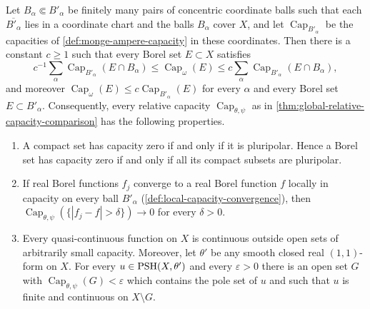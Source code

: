 \begin{proposition}\label{prop:global-local-capacity-equivalence}
Let $B_\alpha\Subset B'_\alpha$ be finitely many pairs of concentric coordinate balls such that each $\overline{B'_\alpha}$ lies in a coordinate chart and the balls $B_\alpha$ cover $X$, and let $\operatorname{Cap}_{B'_\alpha}$ be the capacities of \cref{def:monge-ampere-capacity} in these coordinates. Then there is a constant $c\geq1$ such that every Borel set $E\subset X$ satisfies
\[
 c^{-1}\sum_\alpha\operatorname{Cap}_{B'_\alpha}(E\cap B_\alpha)
  \leq\operatorname{Cap}_\omega(E)
  \leq c\sum_\alpha\operatorname{Cap}_{B'_\alpha}(E\cap B_\alpha),
\]
and moreover $\operatorname{Cap}_\omega(E)\leq c\operatorname{Cap}_{B'_\alpha}(E)$ for every $\alpha$ and every Borel set $E\subset B'_\alpha$. Consequently, every relative capacity $\operatorname{Cap}_{\theta,\psi}$ as in \cref{thm:global-relative-capacity-comparison} has the following properties.
\begin{enumerate}
 \item A compact set has capacity zero if and only if it is pluripolar. Hence a Borel set has capacity zero if and only if all its compact subsets are pluripolar.
 \item If real Borel functions $f_j$ converge to a real Borel function $f$ locally in capacity on every ball $B'_\alpha$ (\cref{def:local-capacity-convergence}), then $\operatorname{Cap}_{\theta,\psi}(\{|f_j-f|>\delta\})\to0$ for every $\delta>0$.
 \item Every quasi-continuous function on $X$ is continuous outside open sets of arbitrarily small capacity. Moreover, let $\theta'$ be any smooth closed real $(1,1)$-form on $X$. For every $u\in\mathrm{PSH}(X,\theta')$ and every $\varepsilon>0$ there is an open set $G$ with $\operatorname{Cap}_{\theta,\psi}(G)<\varepsilon$ which contains the pole set of $u$ and such that $u$ is finite and continuous on $X\setminus G$.
\end{enumerate}
\end{proposition}
